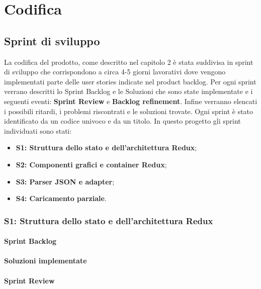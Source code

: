 
\chapter{Codifica}
\label{cap:codifica}

\section{Sprint di sviluppo}
La codifica del prodotto, come descritto nel capitolo 2 è stata suddivisa in sprint di sviluppo che corrispondono a circa 4-5 giorni lavorativi dove vengono implementati parte delle user stories indicate nel product backlog. Per ogni sprint verrano descritti lo Sprint Backlog e le Soluzioni che sono state implementate e i seguenti eventi: \textbf{Sprint Review} e \textbf{Backlog refinement}.
Infine verranno elencati i possibili ritardi, i problemi riscontrati e le soluzioni trovate. Ogni sprint è stato identificato da un codice univoco e da un titolo. In questo progetto gli sprint individuati sono stati:
\begin{itemize}
	\item \textbf{S1: Struttura dello stato e dell'architettura Redux};
	\item \textbf{S2: Componenti grafici e container Redux};
	\item \textbf{S3: Parser JSON e adapter};
	\item \textbf{S4: Caricamento parziale}.
\end{itemize}

\subsection{S1: Struttura dello stato e dell'architettura Redux}
\subsubsection{Sprint Backlog}
\subsubsection{Soluzioni implementate}
\subsubsection{Sprint Review}
